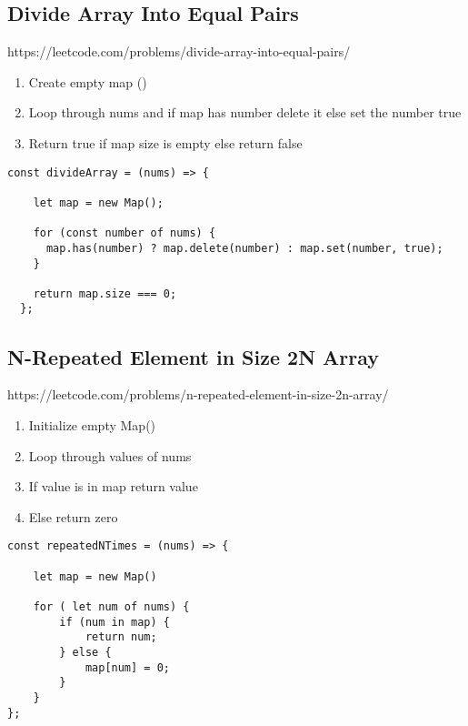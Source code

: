 \documentclass[10pt]{article}
\begin{document}
\pagebreak %
\medskip   
\subsection{Divide Array Into Equal Pairs}
https://leetcode.com/problems/divide-array-into-equal-pairs/

\begin{enumerate}
	\item Create empty map ()
	\item Loop through nums and if map has number delete it else set the number true
	\item Return true if map size is empty else return false
\end{enumerate}

\begin{lstlisting}[title=Solution divideArray, captionpos=t]
const divideArray = (nums) => {
    
    let map = new Map();
      
    for (const number of nums) {
      map.has(number) ? map.delete(number) : map.set(number, true);
    }
      
    return map.size === 0;
  };
\end{lstlisting}

\medskip %




\pagebreak %
\medskip   
\subsection{N-Repeated Element in Size 2N Array}
https://leetcode.com/problems/n-repeated-element-in-size-2n-array/

\begin{enumerate}
	\item Initialize empty Map()
	\item Loop through values of nums
	\item If value is in map return value
	\item Else return zero 
\end{enumerate}

\begin{lstlisting}[title=Solution repeatedNTimes with Map(), captionpos=t]
const repeatedNTimes = (nums) => {
    
    let map = new Map()
    
    for ( let num of nums) {
        if (num in map) {
            return num;
        } else {
            map[num] = 0;
        }
    }
};
\end{lstlisting}
\end{document}
